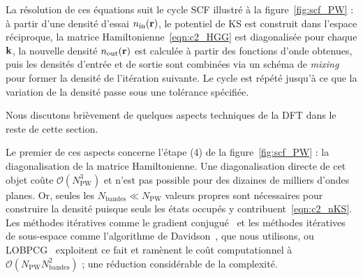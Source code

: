 La résolution de ces équations suit le cycle SCF illustré à la figure~\ref{fig:scf_PW} : à partir d'une densité d'essai $n_\text{in}(\mathbf{r})$, le potentiel de KS est construit dans l'espace réciproque, la matrice Hamiltonienne~\eqref{eqn:c2_HGG} est diagonalisée pour chaque $\mathbf{k}$, la nouvelle densité $n_\text{out}(\mathbf{r})$ est calculée à partir des fonctions d'onde obtenues, puis les densités d'entrée et de sortie sont combinées via un schéma de \textit{mixing} pour former la densité de l'itération suivante. Le cycle est répété jusqu'à ce que la variation de la densité passe sous une tolérance spécifiée.

Nous discutons brièvement de quelques aspects techniques de la DFT dans le reste de cette section.

\bigskip
{}

Le premier de ces aspects concerne l'étape (4) de la figure~\ref{fig:scf_PW} : la diagonalisation de la matrice Hamiltonienne. Une diagonalisation directe de cet objet coûte $\mathcal{O}(N_\text{PW}^3)$ et n'est pas possible pour des dizaines de milliers d'ondes planes. Or, seules les $N_\text{bandes}\ll N_\text{PW}$ valeurs propres sont nécessaires pour construire la densité puisque seuls les états occupés y contribuent~\eqref{eqn:c2_nKS}. Les méthodes itératives comme le gradient conjugué~\cite{hestenesMethodsConjugateGradients} et les méthodes itératives de sous-espace comme l'algorithme de Davidson~\cite{davidsonIterativeCalculationFew1975}, que nous utilisons, ou LOBPCG~\cite{OptimalPreconditionedEigensolver} exploitent ce fait et ramènent le coût computationnel à $\mathcal{O}(N_\text{PW}N_\text{bandes}^2)$ ; une réduction considérable de la complexité.

\bigskip
{}

